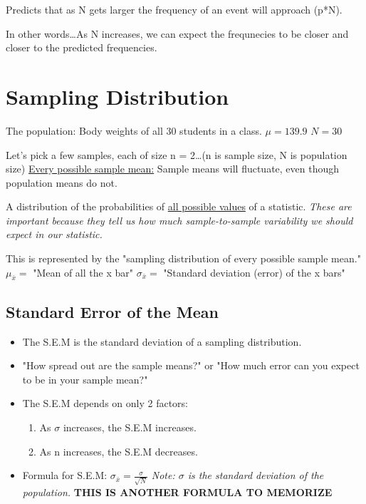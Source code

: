 \documentclass[11pt]{report}
\begin{document}
{
    Predicts that as N gets larger the frequency of an event will approach (p*N). \newline 

    In other words\dots As N increases, we can expect the frequnecies to be closer and closer to the predicted frequencies.
}

\section{Sampling Distribution}

{
    The population: \newline 
    Body weights of all 30 students in a class. \newline
    $\mu = 139.9$ \newline
    $N = 30$ \newline

    Let's pick a few samples, each of size n = 2\dots (n is sample size, N is population size) \newline\newline 
    \underline{Every possible sample mean:} Sample means will fluctuate, even though population means do not. \newline\newline 
}

{
    A distribution of the probabilities of \underline{all possible values} of a statistic. \textit{These are important because they tell us how much sample-to-sample variability we should expect in our statistic.}

    This is represented by the "sampling distribution of every possible sample mean." \newline 
    $\mu_{\bar{x}} = $ "Mean of all the x bar" \newline
    $\sigma_{\bar{x}} = $ "Standard deviation (error) of the x bars" \newline
}

\subsection{Standard Error of the Mean}
\begin{itemize}
    \item The S.E.M is the standard deviation of a sampling distribution.
    \item "How spread out are the sample means?" or "How much error can you expect to be in your sample mean?"
    \item The S.E.M depends on only 2 factors: 
    \begin{enumerate}
        \item As $\sigma$ increases, the S.E.M increases.
        \item As n increases, the S.E.M decreases.
    \end{enumerate}
    \item Formula for S.E.M: $\sigma_{\bar{x}} = \frac{\sigma}{\sqrt{N}}$ {\textit{Note: $\sigma$ is the standard deviation of the population.} \textbf{THIS IS ANOTHER FORMULA TO MEMORIZE}}
\end{itemize}
\end{document}
